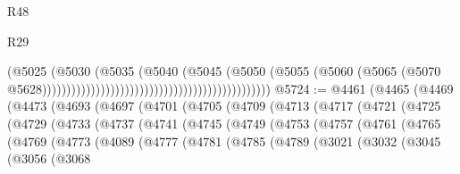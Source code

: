 \begin{lexlean}{R48}
\begin{lexlean}{R29}
\begin{coremodule}
{{{{{{{{{{{{{{{{{{{{{{{{{{{{{{{{{{{{{{{{{{{{{{{{{{{{{{{{{{{{{{{{{{{{{{{{{{{{{{{{{{{{{{{{{{{{{{{{{{{{{{{{{{{{{{{{{{{{{{{{{{{{{{{{{{{{{{{{{{{{{{{{{{{{{{{{{{{{{{{{{{{{{{{{{{{{{{{{{{{{{{{{{{{{{{{{{{{{{{{{{{{{{{{{{{{{{{{{{{                                                                              (@5025
                                                                                (@5030
                                                                                  (@5035
                                                                                    (@5040
                                                                                      (@5045
                                                                                        (@5050
                                                                                          (@5055
                                                                                            (@5060
                                                                                              (@5065
                                                                                                (@5070
                                                                                                  @5628)))))))))))))))))))))))))))))))))))))))))))))))
@5724 := @4461
    (@4465
      (@4469
        (@4473
          (@4693
            (@4697
              (@4701
                (@4705
                  (@4709
                    (@4713
                      (@4717
                        (@4721
                          (@4725
                            (@4729
                              (@4733
                                (@4737
                                  (@4741
                                    (@4745
                                      (@4749
                                        (@4753
                                          (@4757
                                            (@4761
                                              (@4765
                                                (@4769
                                                  (@4773
                                                    (@4089
                                                      (@4777
                                                        (@4781
                                                          (@4785
                                                            (@4789
                                                              (@3021
                                                                (@3032
                                                                  (@3045
                                                                    (@3056
                                                                      (@3068
}}}}}}}}}}}}}}}}}}}}}}}}}}}}}}}}}}}}}}}}}}}}}}}}}}}}}}}}}}}}}}}}}}}}}}}}}}}}}}}}}}}}}}}}}}}}}}}}}}}}}}}}}}}}}}}}}}}}}}}}}}}}}}}}}}}}}}}}}}}}}}}}}}}}}}}}}}}}}}}}}}}}}}}}}}}}}}}}}}}}}}}}}}}}}}}}}}}}}}}}}}}}}}}}}}}}}}}}}}
\end{coremodule}
\end{lexlean}
\end{lexlean}
